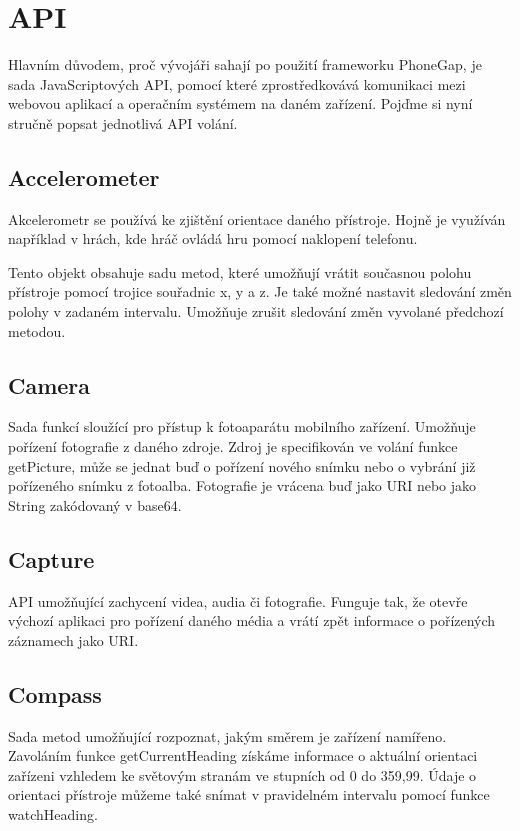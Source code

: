 \section{API} \label{Sec:API}
Hlavním důvodem, proč vývojáři sahají po použití frameworku PhoneGap, je sada JavaScriptových API, pomocí které zprostředkovává komunikaci mezi webovou aplikací a operačním systémem na daném zařízení. Pojďme si nyní stručně popsat jednotlivá API volání.

\subsection{Accelerometer}
Akcelerometr se používá ke zjištění orientace daného přístroje. Hojně je využíván například v hrách, kde hráč ovládá hru pomocí naklopení telefonu.

Tento objekt obsahuje sadu metod, které umožňují vrátit současnou polohu přístroje pomocí trojice souřadnic x, y a z. Je také možné nastavit sledování změn polohy v zadaném intervalu.
Umožňuje zrušit sledování změn vyvolané předchozí metodou.

\subsection{Camera}
Sada funkcí sloužící pro přístup k fotoaparátu mobilního zařízení. Umožňuje pořízení fotografie z daného zdroje. Zdroj je specifikován ve volání funkce getPicture, může se jednat buď o pořízení nového snímku nebo o vybrání již pořízeného snímku z fotoalba. Fotografie je vrácena buď jako URI nebo jako String zakódovaný v base64.

\subsection{Capture}
API umožňující zachycení videa, audia či fotografie. Funguje tak, že otevře výchozí aplikaci pro pořízení daného média a vrátí zpět informace o pořízených záznamech jako URI.

\subsection{Compass}
Sada metod umožňující rozpoznat, jakým směrem je zařízení namířeno. Zavoláním funkce getCurrentHeading získáme informace o aktuální orientaci zařízeni vzhledem ke světovým stranám ve stupních od 0 do 359,99. Údaje o orientaci přístroje můžeme také snímat v pravidelném intervalu pomocí funkce watchHeading.

